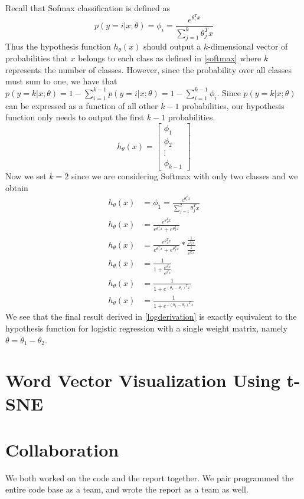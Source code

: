 \documentclass{article}
\begin{document}
Recall that Sofmax classification is defined as
\begin{equation}\label{softmax}
p(y=i|x;\theta) = \phi_{i} = \frac{e^{\theta^T_{i}x}}{\sum_{j=1}^k \theta^T_{j}x}
\end{equation}
Thus the hypothesis function \( h_{\theta}(x) \) should output a \(k\)-dimensional vector of probabilities that \(x\) belongs to each class as defined in \eqref{softmax} where \(k\) represents the number of classes.  However, since the probability over all classes must sum to one, we have that \(p(y=k|x;\theta) = 1 - \sum_{i=1}^{k-1} p(y=i|x;\theta) = 1 -\sum_{i=1}^{k-1}  \phi_{i}\).  Since \(p(y=k|x;\theta)\) can be expressed as a function of all other \(k-1\) probabilities, our hypothesis function only needs to output the first \(k-1\) probabilities.
\begin{equation}
h_{\theta}(x) = \begin{bmatrix}  \phi_{1}\\  \phi_{2} \\ \vdots \\ \phi_{k-1}\end{bmatrix}
\end{equation}
Now we set \(k=2\) since we are considering Softmax with only two classes and we obtain
\begin{equation}
\begin{aligned}\label{logderivation}
h_{\theta}(x) &= \phi_{1} = \frac{e^{\theta^T_{1}x}}{\sum_{j=1}^2 \theta^T_{j}x} \\
h_{\theta}(x) &= \frac{e^{\theta^T_{1}x}}{e^{\theta^T_{1}x}+e^{\theta^T_{2}x}} \\
h_{\theta}(x) &= \frac{e^{\theta^T_{1}x}}{e^{\theta^T_{1}x}+e^{\theta^T_{2}x}} * \frac{\frac{1}{e^{\theta^T_{1}x}}}{\frac{1}{e^{\theta^T_{1}x}}} \\
h_{\theta}(x) &= \frac{1}{1+\frac{e^{\theta^T_{2}x}}{e^{\theta^T_{1}x}}} \\
h_{\theta}(x) &= \frac{1}{1+e^{\left(\theta_{2}-\theta_{1}\right)^Tx}} \\
h_{\theta}(x) &= \frac{1}{1+e^{-\left(\theta_{1}-\theta_{2}\right)^Tx}}
\end{aligned}
\end{equation}
We see that the final result derived in \eqref{logderivation} is exactly equivalent to the hypothesis function for   logistic regression with a single weight matrix, namely \(\theta = \theta_{1}-\theta_{2} \).

\section{Word Vector Visualization Using t-SNE}\label{tsne}


\section{Collaboration}
We both worked on the code and the report together. We pair programmed the entire code base as a team, and wrote the report as a team as well.
\end{document}
